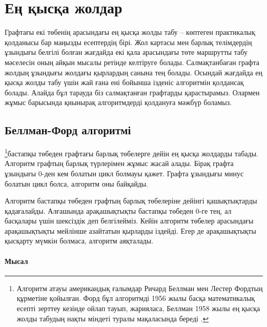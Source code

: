 \chapter{Ең қысқа жолдар}


Графтағы екі төбенің арасындағы ең қысқа жолды табу -- көптеген практикалық қолданысы бар маңызды есептердің бірі. Жол картасы мен барлық телімдердің ұзындығы белгілі болған жағдайда екі қала арасындағы төте маршрутты табу мәселесін оның айқын мысалы ретінде келтіруге болады.   
Салмақтанбаған графта жолдың ұзындығы жолдағы қырлардың
санына тең болады. Осындай жағдайда ең қысқа жолды табу үшін жай ғана ені бойынша ізденіс алгоритмін қолдансақ болады.
Алайда бұл тарауда біз салмақтанған графтарды қарастырамыз. 
Олармен жұмыс барысында қиынырақ алгоритмдерді
қолдануға мәжбүр боламыз.

\section{Беллман-Форд алгоритмі}


\footnote{Алгоритм атауы американдық ғалымдар Ричард Беллман мен Лестер Фордтың құрметіне қойылған. Форд бұл алгоритмді 1956 жылы басқа математикалық есепті зерттеу кезінде ойлап тауып, жарияласа, Беллман 1958 жылы ең қысқа жолды табудың нақты міндеті туралы мақаласында береді \cite{bel58,for56a}.}бастапқы төбеден графтағы барлық
төбелерге дейін ең қысқа жолдарды табады.
Алгоритм графтың барлық түрлерімен жұмыс жасай алады. Бірақ
графта ұзындығы $0$-ден кем болатын цикл болмауы қажет.
Графта ұзындығы минус болатын цикл болса, алгоритм оны байқайды.

Алгоритм бастапқы төбеден графтың барлық төбелеріне
дейінгі қашықтықтарды қадағалайды. Алғашында
арақашықтықты бастапқы төбеден $0$-ге тең, ал басқалары үшін шексіздік
деп белгілейміз. Кейін алгоритм төбелер арасындағы арақашықтықты
мейлінше азайтатын қырларды іздейді. Егер де арақашықтықты қысқарту мүмкін
болмаса, алгоритм аяқталады.

\subsubsection{Мысал}

